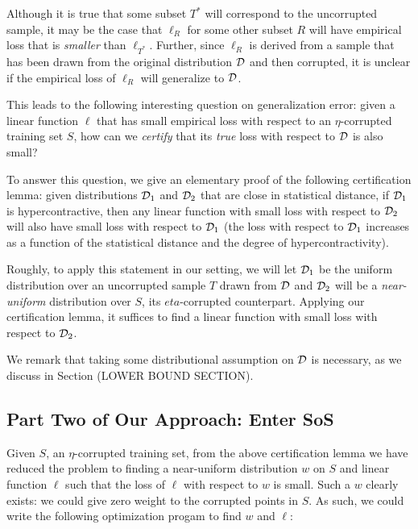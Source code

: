 Although it is true that some subset $T^{*}$ will correspond to the
uncorrupted sample, it may be the case that $\ell_R$ for some other
subset $R$ will have empirical loss that is {\em smaller} than
$\ell_{T^{*}}$.  Further, since $\ell_R$ is derived from a sample that
has been drawn from the original distribution ${\cal D}$ and then
corrupted, it is unclear if the empirical loss of $\ell_R$ will
generalize to ${\cal D}$.

This leads to the following interesting question on generalization
error: given a linear function $\ell$ that has small empirical loss
with respect to an $\eta$-corrupted training set $S$, how can we {\em
  certify} that its {\em true} loss with respect to ${\cal D}$ is also
small?

To answer this question, we give an elementary proof of the following
certification lemma: given distributions ${\cal D}_1$ and ${\cal D}_2$ that
are close in statistical distance, if ${\cal D}_1$ is
hypercontractive, then any linear function with small loss with
respect to ${\cal D}_2$ will also have small loss with respect to
${\cal D}_1$ (the loss with respect to ${\cal D}_1$ increases as a
function of the statistical distance and the degree of hypercontractivity).

Roughly, to apply this statement in our setting, we will let
${\cal D}_1$ be the uniform distribution over an uncorrupted sample
$T$ drawn from ${\cal D}$ and ${\cal D}_2$ will be a {\em
  near-uniform} distribution over $S$, its $eta$-corrupted
counterpart.  Applying our certification lemma, it suffices to find a
linear function with small loss with respect to ${\cal D}_2$.
  
We remark that taking some distributional assumption on ${\cal D}$ is
necessary, as we discuss in Section (LOWER BOUND SECTION).

\subsection{Part Two of Our Approach: Enter SoS}

Given $S$, an $\eta$-corrupted training set, from the above
certification lemma we have reduced the problem to finding a
near-uniform distribution $w$ on $S$ and linear function $\ell$ such
that the loss of $\ell$ with respect to $w$ is small.  Such a $w$
clearly exists: we could give zero weight to the corrupted points in
$S$.  As such, we could write the following optimization progam to
find $w$ and $\ell$:

